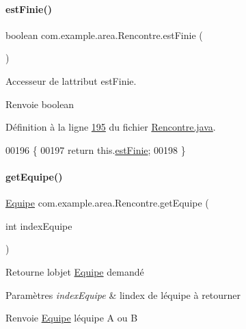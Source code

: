\paragraph{\texorpdfstring{est\+Finie()}{estFinie()}}
{\footnotesize\ttfamily boolean com.\+example.\+area.\+Rencontre.\+est\+Finie (\begin{DoxyParamCaption}{ }\end{DoxyParamCaption})}



Accesseur de l\textquotesingle{}attribut est\+Finie. 

\begin{DoxyReturn}{Renvoie}
boolean 
\end{DoxyReturn}


Définition à la ligne \hyperlink{_rencontre_8java_source_l00195}{195} du fichier \hyperlink{_rencontre_8java_source}{Rencontre.\+java}.


\begin{DoxyCode}
00196     \{
00197         \textcolor{keywordflow}{return} this.\hyperlink{classcom_1_1example_1_1area_1_1_rencontre_abafd9770f1e749026b7a4196648fa366}{estFinie};
00198     \}
\end{DoxyCode}
\mbox{\label{classcom_1_1example_1_1area_1_1_rencontre_a5bd76838a3c61a6e8e6204981218e10e}} 
\paragraph{\texorpdfstring{get\+Equipe()}{getEquipe()}}
{\footnotesize\ttfamily \hyperlink{classcom_1_1example_1_1area_1_1_equipe}{Equipe} com.\+example.\+area.\+Rencontre.\+get\+Equipe (\begin{DoxyParamCaption}\item[{int}]{index\+Equipe }\end{DoxyParamCaption})}



Retourne l\textquotesingle{}objet \hyperlink{classcom_1_1example_1_1area_1_1_equipe}{Equipe} demandé 


\begin{DoxyParams}{Paramètres}
{\em index\+Equipe} & l\textquotesingle{}index de l\textquotesingle{}équipe à retourner \\
\hline
\end{DoxyParams}
\begin{DoxyReturn}{Renvoie}
\hyperlink{classcom_1_1example_1_1area_1_1_equipe}{Equipe} l\textquotesingle{}équipe A ou B 
\end{DoxyReturn}


